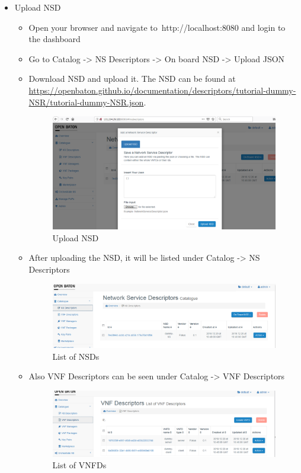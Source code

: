 \begin{itemize}
				\item Upload NSD
				\begin{itemize}
					\item Open your browser and navigate to http://localhost:8080 and login to the dashboard
					\item Go to Catalog -> NS Descriptors -> On board NSD -> Upload JSON
					\item Download NSD and upload it. The NSD can be found at \hyperlink{name}{https://openbaton.github.io/documentation/descriptors/tutorial-dummy-NSR/tutorial-dummy-NSR.json}. 
					\begin{figure} [h]
						\centering
						\includegraphics[width=0.7\linewidth]{figures/uploadNSD}
						\caption{Upload NSD}
						\label{fig:uploadNSD}
					\end{figure}
					\item After uploading the NSD, it will be listed under Catalog -> NS Descriptors
					\begin{figure} [h]
						\centering
						\includegraphics[width=0.7\linewidth]{figures/NSDList}
						\caption{List of NSDs}
						\label{fig:NSDList}
					\end{figure}
					\item Also VNF Descriptors can be seen under Catalog -> VNF Descriptors				
					\begin{figure} [h]
						\centering
						\includegraphics[width=0.7\linewidth]{figures/VNFDList}
						\caption{List of VNFDs}
						\label{fig:VNFDList}
					\end{figure}
				\end{itemize}
			

\end{itemize}
